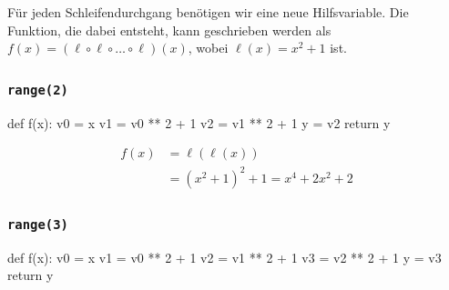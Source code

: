 \documentclass[
  letterpaper,
  DIV=11,
  oneside]{scrreprt}
\newenvironment{Shaded}{\begin{snugshade}}{\end{snugshade}}
\newcommand{\ControlFlowTok}[1]{\textcolor[rgb]{0.00,0.23,0.31}{#1}}
\newcommand{\DecValTok}[1]{\textcolor[rgb]{0.68,0.00,0.00}{#1}}
\newcommand{\KeywordTok}[1]{\textcolor[rgb]{0.00,0.23,0.31}{#1}}
\newcommand{\NormalTok}[1]{\textcolor[rgb]{0.00,0.23,0.31}{#1}}
\newcommand{\OperatorTok}[1]{\textcolor[rgb]{0.37,0.37,0.37}{#1}}
\theoremstyle{definition}
\theoremstyle{definition}
\theoremstyle{remark}
\begin{document}
\begin{tcolorbox}[enhanced jigsaw, title=\textcolor{quarto-callout-tip-color}{\faLightbulb}\hspace{0.5em}{Lösung}, colbacktitle=quarto-callout-tip-color!10!white, bottomrule=.15mm, titlerule=0mm, colback=white, breakable, colframe=quarto-callout-tip-color-frame, bottomtitle=1mm, toptitle=1mm, leftrule=.75mm, arc=.35mm, left=2mm, rightrule=.15mm, toprule=.15mm, opacitybacktitle=0.6, opacityback=0, coltitle=black]

Für jeden Schleifendurchgang benötigen wir eine neue Hilfsvariable. Die
Funktion, die dabei entsteht, kann geschrieben werden als
\(f(x) = (\ell \circ \ell \circ \ldots \circ \ell)(x)\), wobei
\(\ell(x) = x^2 + 1\) ist.

\hypertarget{range2}{%
\subsubsection{\texorpdfstring{\texttt{range(2)}}{range(2)}}\label{range2}}

\begin{Shaded}
\begin{Highlighting}[]
\KeywordTok{def}\NormalTok{ f(x):}
\NormalTok{    v0 }\OperatorTok{=}\NormalTok{ x}
\NormalTok{    v1 }\OperatorTok{=}\NormalTok{ v0 }\OperatorTok{**} \DecValTok{2} \OperatorTok{+} \DecValTok{1}
\NormalTok{    v2 }\OperatorTok{=}\NormalTok{ v1 }\OperatorTok{**} \DecValTok{2} \OperatorTok{+} \DecValTok{1}
\NormalTok{    y }\OperatorTok{=}\NormalTok{ v2}
    \ControlFlowTok{return}\NormalTok{ y}
\end{Highlighting}
\end{Shaded}

\[
\begin{flalign}
    f(x) &= \ell(\ell(x)) \\ 
         &= (x^2 + 1)^2 + 1 = x^4 + 2x^2 + 2
\end{flalign}
\]

\hypertarget{range3}{%
\subsubsection{\texorpdfstring{\texttt{range(3)}}{range(3)}}\label{range3}}

\begin{Shaded}
\begin{Highlighting}[]
\KeywordTok{def}\NormalTok{ f(x):}
\NormalTok{    v0 }\OperatorTok{=}\NormalTok{ x}
\NormalTok{    v1 }\OperatorTok{=}\NormalTok{ v0 }\OperatorTok{**} \DecValTok{2} \OperatorTok{+} \DecValTok{1}
\NormalTok{    v2 }\OperatorTok{=}\NormalTok{ v1 }\OperatorTok{**} \DecValTok{2} \OperatorTok{+} \DecValTok{1}
\NormalTok{    v3 }\OperatorTok{=}\NormalTok{ v2 }\OperatorTok{**} \DecValTok{2} \OperatorTok{+} \DecValTok{1}
\NormalTok{    y }\OperatorTok{=}\NormalTok{ v3}
    \ControlFlowTok{return}\NormalTok{ y}
\end{Highlighting}
\end{Shaded}


\end{tcolorbox}
\end{document}

